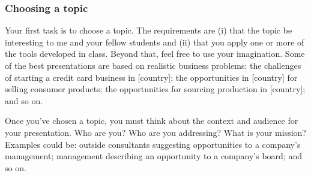 \documentclass[letterpaper,12pt]{article}
\begin{document}
\subsubsection*{Choosing a topic}

Your first task is to choose a topic.  
The requirements are (i) that the topic be interesting to me and your fellow students  
and (ii) that you apply one or more of the tools developed in class.  
Beyond that, feel free to use your imagination.   
Some of the best presentations are based on realistic business problems:
the challenges of starting a credit card business in [country]; 
the opportunities in [country] for selling consumer products; 
the opportunities for sourcing production in [country]; 
and so on.  


Once you've chosen a topic, 
you must think about the context and audience for your presentation.
Who are you?  Who are you addressing?  What is your mission? 
Examples could be:  outside consultants suggesting opportunities 
to a company's management; 
management describing an opportunity to a company's board; and so on.  
\end{document}
